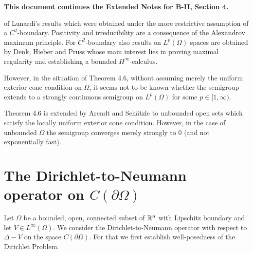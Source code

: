 %
%
%
%
%

\bigskip
\textbf{This document continues the Extended Notes for B-II, Section 4.}
\bigskip

of Lunardi's results which were obtained under the more restrictive assumption of a $C^2$-boundary. Positivity and irreducibility are a consequence of the Alexandrov maximum principle. For $C^2$-boundary also results on $L^p(\Omega)$ spaces are obtained by Denk, Hieber and Prüss \cite{DHP03} whose main interest lies in proving maximal regularity and establishing a bounded $H^\infty$-calculus.

However, in the situation of Theorem 4.6, without assuming merely the uniform exterior cone condition on $\Omega$, it seems not to be known whether the semigroup extends to a strongly continuous semigroup on $L^p(\Omega)$ for some $p \in [1,\infty)$.

Theorem 4.6 is extended by Arendt and Schätzle \cite{AS25} to unbounded open sets which satisfy the locally uniform exterior cone condition. However, in the case of unbounded $\Omega$ the semigroup converges merely strongly to $0$ (and not exponentially fast).

\section{The Dirichlet-to-Neumann operator on $C(\partial\Omega)$}

Let $\Omega$ be a bounded, open, connected subset of $\mathbb{R}^n$ with Lipschitz boundary and let $V \in L^\infty(\Omega)$. We consider the Dirichlet-to-Neumann operator with respect to $\Delta - V$ on the space $C(\partial\Omega)$. For that we first establish well-posedness of the Dirichlet Problem.

